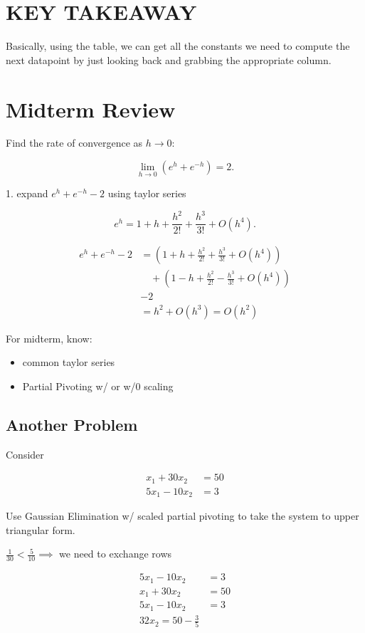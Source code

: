 \documentclass[12pt]{article}
\begin{document}
\section{KEY TAKEAWAY}

Basically, using the table, we can get all the constants we need to compute the
next datapoint by just looking back and grabbing the appropriate column.

\section{Midterm Review}

Find the rate of convergence as $h\to 0$:

\[
  \lim_{h \to 0} (e^h + e^{-h}) = 2
.\]

1. expand $e^h + e^{-h} - 2$ using taylor series

\[
  e^h = 1+h + \frac{h^2}{2!} + \frac{h^3}{3!} + O(h^4)
.\]


\begin{align*}
  e^h + e^{-h} -2 &= \left(1+h + \frac{h^2}{2!} + \frac{h^3}{3!} + O(h^4) \right ) \\
                  &\quad + \left ( 1-h+\frac{h^2}{2!}-\frac{h^3}{3!}+O(h^4) \right ) \\
                  &-2 \\
                  &= h^2 + O(h^3) = O(h^2)
\end{align*}

For midterm, know:
\begin{itemize}
  \item common taylor series 
  \item Partial Pivoting w/ or w/0 scaling
\end{itemize}

\subsection{Another Problem}

Consider

\begin{align*}
  x_1 + 30x_2 &= 50 \\
  5x_1 - 10x_2 &=  3
\end{align*}

Use Gaussian Elimination w/ scaled partial pivoting to take the system to upper
triangular form.

$\displaystyle \frac{1}{30} < \frac{5}{10} \implies$ we need to exchange rows

\begin{align*}
  5x_1 - 10x_2 &=  3 \\
   x_1 + 30x_2 &= 50 \\
  \hline
  5x_1 - 10x_2 &=  3 \\
  32x_2 = 50 - \frac{3}{5}
\end{align*}
\end{document}
